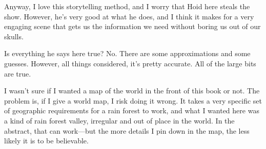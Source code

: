Anyway, I love this storytelling method, and I worry that Hoid here steals the show. However, he’s very good at what he does, and I think it makes for a very engaging scene that gets us the information we need without boring us out of our skulls.

Is everything he says here true? No. There are some approximations and some guesses. However, all things considered, it’s pretty accurate. All of the large bits are true.

I wasn’t sure if I wanted a map of the world in the front of this book or not. The problem is, if I give a world map, I risk doing it wrong. It takes a very specific set of geographic requirements for a rain forest to work, and what I wanted here was a kind of rain forest valley, irregular and out of place in the world. In the abstract, that can work—but the more details I pin down in the map, the less likely it is to be believable.



